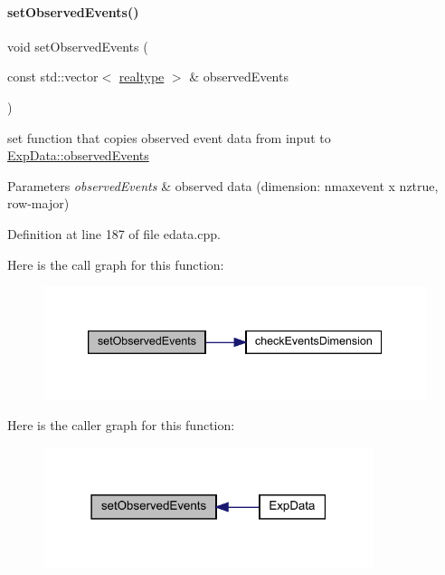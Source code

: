 \paragraph{\texorpdfstring{set\+Observed\+Events()}{setObservedEvents()}\hspace{0.1cm}{\footnotesize\ttfamily [1/2]}}
{\footnotesize\ttfamily void set\+Observed\+Events (\begin{DoxyParamCaption}\item[{const std\+::vector$<$ \mbox{\hyperlink{namespaceamici_a1bdce28051d6a53868f7ccbf5f2c14a3}{realtype}} $>$ \&}]{observed\+Events }\end{DoxyParamCaption})}

set function that copies observed event data from input to \mbox{\hyperlink{classamici_1_1_exp_data_a629e6085839e16bac95ef0eba580f7f0}{Exp\+Data\+::observed\+Events}}


\begin{DoxyParams}{Parameters}
{\em observed\+Events} & observed data (dimension\+: nmaxevent x nztrue, row-\/major) \\
\hline
\end{DoxyParams}


Definition at line 187 of file edata.\+cpp.

Here is the call graph for this function\+:
\nopagebreak
\begin{figure}[H]
\begin{center}
\leavevmode
\includegraphics[width=339pt]{classamici_1_1_exp_data_ae621c2d67f85f390d01a97658c956098_cgraph}
\end{center}
\end{figure}
Here is the caller graph for this function\+:
\nopagebreak
\begin{figure}[H]
\begin{center}
\leavevmode
\includegraphics[width=274pt]{classamici_1_1_exp_data_ae621c2d67f85f390d01a97658c956098_icgraph}
\end{center}
\end{figure}
\mbox{\label{classamici_1_1_exp_data_a22ae335c4988600623e7a0c5ca7b47aa}} 
